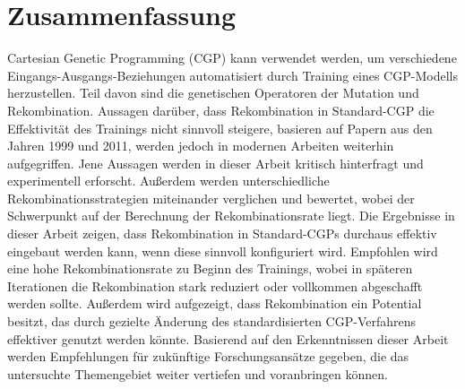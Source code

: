 \section*{Zusammenfassung}

Cartesian Genetic Programming (CGP) kann verwendet werden, um verschiedene Eingangs-Ausgangs-Beziehungen automatisiert durch Training eines CGP-Modells herzustellen.
Teil davon sind die genetischen Operatoren der Mutation und Rekombination.
Aussagen darüber, dass Rekombination in Standard-CGP die Effektivität des Trainings nicht sinnvoll steigere, basieren auf Papern aus den Jahren 1999 und 2011, werden jedoch in modernen Arbeiten weiterhin aufgegriffen.
Jene Aussagen werden in dieser Arbeit kritisch hinterfragt und experimentell erforscht.
Außerdem werden unterschiedliche Rekombinationsstrategien miteinander verglichen und bewertet, wobei der Schwerpunkt auf der Berechnung der Rekombinationsrate liegt.
Die Ergebnisse in dieser Arbeit zeigen, dass Rekombination in Standard-CGPs durchaus effektiv eingebaut werden kann, wenn diese sinnvoll konfiguriert wird.
Empfohlen wird eine hohe Rekombinationsrate zu Beginn des Trainings, wobei in späteren Iterationen die Rekombination stark reduziert oder vollkommen abgeschafft werden sollte.
Außerdem wird aufgezeigt, dass Rekombination ein Potential besitzt, das durch gezielte Änderung des standardisierten CGP-Verfahrens effektiver genutzt werden könnte.
Basierend auf den Erkenntnissen dieser Arbeit werden Empfehlungen für zukünftige Forschungsansätze gegeben, die das untersuchte Themengebiet weiter vertiefen und voranbringen können.
